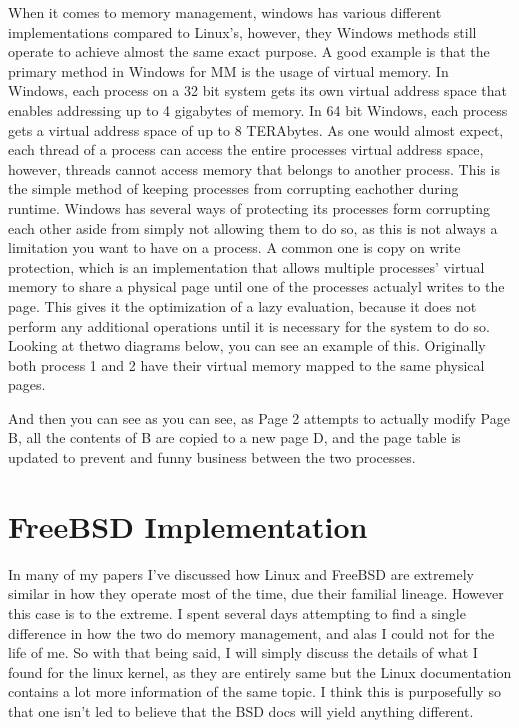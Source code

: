 \documentclass[10pt,draftclsnofoot,onecolumn]{IEEEtran}
\begin{document}
When it comes to memory management, windows has various different implementations
compared to Linux's, however, they Windows methods still operate to achieve
almost the same exact purpose. A good example is that the primary method in
Windows for MM is the usage of virtual memory. In Windows, each process on a 32
bit system gets its own virtual address space that enables addressing up to 4
gigabytes of memory. In 64 bit Windows, each process gets a virtual address space
of up to 8 TERAbytes. As one would almost expect, each thread of a process can
access the entire processes virtual address space, however, threads cannot access
memory that belongs to another process. This is the simple method of keeping
processes from corrupting eachother during runtime. Windows has several ways of
protecting its processes form corrupting each other aside from simply not allowing
them to do so, as this is not always a limitation you want to have on a process.
A common one is copy on write protection, which is an implementation that allows
multiple processes' virtual memory to share a physical page until one of the
processes actualyl writes to the page. This gives it the optimization of a lazy
evaluation, because it does not perform any additional operations until it is
necessary for the system to do so. Looking at thetwo diagrams below, you can
see an example of this. Originally both process 1 and 2 have their virtual
memory mapped to the same physical pages.



And then you can see as you can see, as Page 2 attempts to actually modify Page
B, all the contents of B are copied to a new page D, and the page table is updated
to prevent and funny business between the two processes.



\newpage
\section{FreeBSD Implementation}

In many of my papers I've discussed how Linux and FreeBSD are extremely similar
in how they operate most of the time, due their familial lineage. However this
case is to the extreme. I spent several days attempting to find a single
difference in how the two do memory management, and alas I could not for the life
of me. So with that being said, I will simply discuss the details of what I found
for the linux kernel, as they are entirely same but the Linux documentation
contains a lot more information of the same topic. I think this is purposefully
so that one isn't led to believe that the BSD docs will yield anything different.
\end{document}
